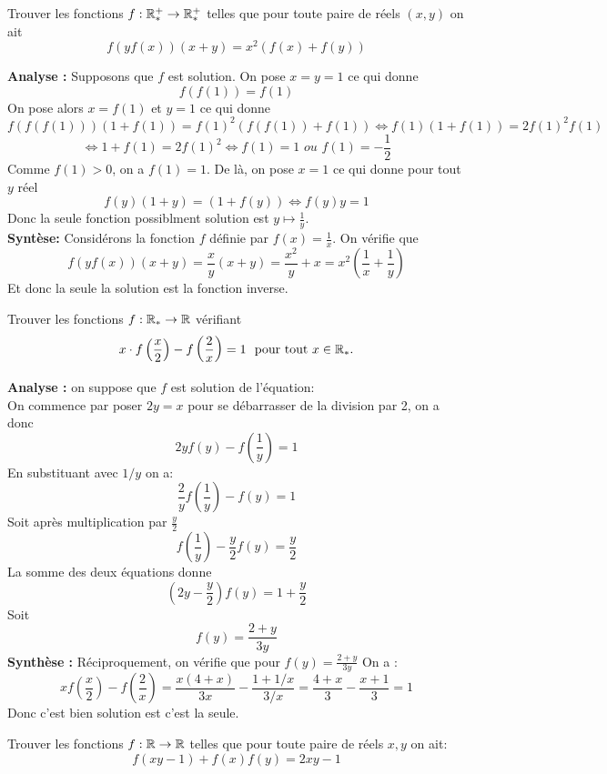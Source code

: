 \begin{exo}[M]
Trouver les fonctions $f:\mathbb R_*^+\to \mathbb R_*^+$ telles que pour toute paire de réels $(x,y)$ on ait
$$f(yf(x))(x+y)=x^2(f(x)+f(y)) $$
\end{exo}
\begin{preuve}
\textbf{Analyse :} Supposons que $f$ est solution. On pose $x=y=1$ ce qui donne
$$f(f(1))=f(1) $$
On pose alors $x=f(1)$ et $y=1$ ce qui donne
$$f(f(f(1)))(1+f(1))=f(1)^2(f(f(1))+f(1))\iff f(1)(1+f(1))=2f(1)^2f(1)$$ $$\iff 1+f(1)=2f(1)^2\iff f(1)=1 \textit{ ou } f(1)=-\frac{1}{2} $$
Comme $f(1)>0$, on a $f(1)=1$. De là, on pose $x=1$ ce qui donne pour tout $y$ réel
$$f(y)(1+y)=(1+f(y))\iff f(y)y=1 $$
Donc la seule fonction possiblment solution est $y\mapsto \frac{1}{y}$.
\\
\textbf{Syntèse:}
Considérons la fonction $f$ définie par $f(x)=\frac{1}{x}$. On vérifie que $$f(yf(x))(x+y)=\frac{x}{y}(x+y)=\frac{x^2}{y}+x=x^2\left(\frac{1}{x}+ \frac{1}{y}\right) $$
Et donc la seule la solution est la fonction inverse.
\end{preuve}
\begin{exo}[M]
Trouver les fonctions $f:\mathbb R_*\to \mathbb R$ vérifiant
$$x \cdot f\left(\frac{x}{2}\right) - f\left(\frac{2}{x}\right) = 1 \ \text{ pour tout } x \in \mathbb R_*. $$
\end{exo}
\begin{preuve}
\textbf{Analyse :} on suppose que $f$ est solution de l'équation:
\\

On commence par poser $2y=x$ pour se débarrasser de la division par 2, on a donc
$$2yf(y)-f\left(\frac{1}{y}\right)=1$$
En substituant avec $1/y$ on a:
$$\frac{2}{y}f\left(\frac{1}{y}\right)-f(y)=1$$
Soit après multiplication par $\frac{y}{2}$
$$f\left(\frac{1}{y}\right)-\frac{y}{2}f(y)=\frac{y}{2}$$
La somme des deux équations donne
$$\left(2y-\frac{y}{2}\right)f(y)=1+\frac{y}{2}$$
Soit $$f(y)=\frac{2+y}{3y}$$
\textbf{Synthèse :}
Réciproquement, on vérifie que
pour $f(y)=\frac{2+y}{3y}$
On a :
$$xf\left(\frac{x}{2}\right)-f\left(\frac{2}{x}\right)=\frac{x(4+x)}{3x}-\frac{1+1/x}{3/x}=\frac{4+x}{3}-\frac{x+1}{3}=1$$
Donc c'est bien solution est c'est la seule.
\end{preuve}

\begin{exo}[D]
Trouver les fonctions $f:\mathbb R\to \mathbb R$ telles que pour toute paire de réels $x,y$ on ait:
$$f(xy-1)+f(x)f(y)=2xy-1 $$
\end{exo}

